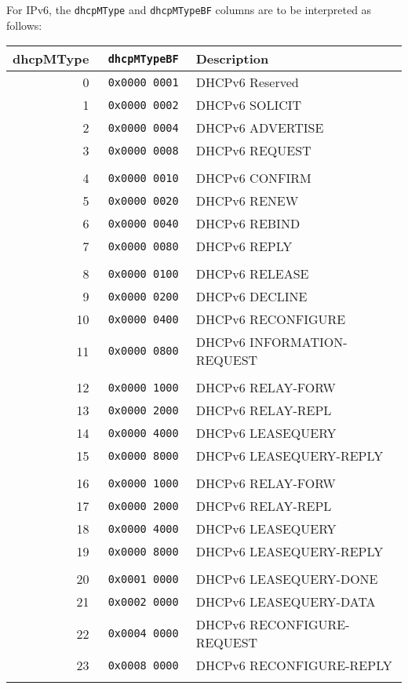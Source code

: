\documentclass[documentation]{subfiles}
\begin{document}
For IPv6, the {\tt dhcpMType} and {\tt dhcpMTypeBF} columns are to be interpreted as follows:
\begin{longtable}{r>{\tt}rl}
    \toprule
    {\bf dhcpMType} & {\bf dhcpMTypeBF} & {\bf Description}\\
    \midrule\endhead%
    0  & 0x0000 0001 & DHCPv6 Reserved\\
    1  & 0x0000 0002 & DHCPv6 SOLICIT\\
    2  & 0x0000 0004 & DHCPv6 ADVERTISE\\
    3  & 0x0000 0008 & DHCPv6 REQUEST\\
    \\
    4  & 0x0000 0010 & DHCPv6 CONFIRM\\
    5  & 0x0000 0020 & DHCPv6 RENEW\\
    6  & 0x0000 0040 & DHCPv6 REBIND\\
    7  & 0x0000 0080 & DHCPv6 REPLY\\
    \\
    8  & 0x0000 0100 & DHCPv6 RELEASE\\
    9  & 0x0000 0200 & DHCPv6 DECLINE\\
    10 & 0x0000 0400 & DHCPv6 RECONFIGURE\\
    11 & 0x0000 0800 & DHCPv6 INFORMATION-REQUEST\\
    \\
    12 & 0x0000 1000 & DHCPv6 RELAY-FORW\\
    13 & 0x0000 2000 & DHCPv6 RELAY-REPL\\
    14 & 0x0000 4000 & DHCPv6 LEASEQUERY\\
    15 & 0x0000 8000 & DHCPv6 LEASEQUERY-REPLY\\
    \\
    16 & 0x0000 1000 & DHCPv6 RELAY-FORW\\
    17 & 0x0000 2000 & DHCPv6 RELAY-REPL\\
    18 & 0x0000 4000 & DHCPv6 LEASEQUERY\\
    19 & 0x0000 8000 & DHCPv6 LEASEQUERY-REPLY\\
    \\
    20 & 0x0001 0000 & DHCPv6 LEASEQUERY-DONE\\
    21 & 0x0002 0000 & DHCPv6 LEASEQUERY-DATA\\
    22 & 0x0004 0000 & DHCPv6 RECONFIGURE-REQUEST\\
    23 & 0x0008 0000 & DHCPv6 RECONFIGURE-REPLY\\
    \\

\end{longtable}
\end{document}
